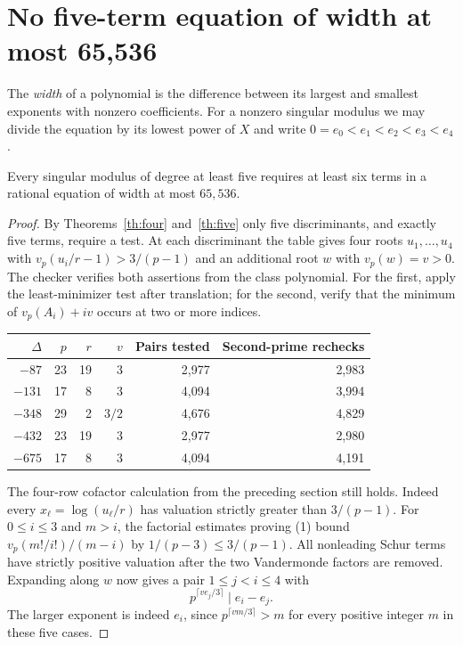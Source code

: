 \section{No five-term equation of width at most 65,536}
The \emph{width} of a polynomial is the difference between its largest and smallest exponents with nonzero coefficients. For a nonzero singular modulus we may divide the equation by its lowest power of $X$ and write $0=e_0<e_1<e_2<e_3<e_4$.

\begin{corollary}\label{cor:width}
Every singular modulus of degree at least five requires at least six terms in a rational equation of width at most $65{,}536$.
\end{corollary}
\begin{proof}
By Theorems~\ref{th:four} and~\ref{th:five} only five discriminants, and exactly five terms, require a test. At each discriminant the table gives four roots $u_1,\ldots,u_4$ with $v_p(u_i/r-1)>3/(p-1)$ and an additional root $w$ with $v_p(w)=v>0$. The checker verifies both assertions from the class polynomial. For the first, apply the least-minimizer test after translation; for the second, verify that the minimum of $v_p(A_i)+iv$ occurs at two or more indices.
\begin{center}\small
\begin{tabular}{@{}rrrrrr@{}}\toprule
$\Delta$ & $p$ & $r$ & $v$ & Pairs tested & Second-prime rechecks \\ \midrule
$-87$  & 23 & 19 & 3   & 2,977 & 2,983 \\
$-131$ & 17 &  8 & 3   & 4,094 & 3,994 \\
$-348$ & 29 &  2 & $3/2$ & 4,676 & 4,829 \\
$-432$ & 23 & 19 & 3   & 2,977 & 2,980 \\
$-675$ & 17 &  8 & 3   & 4,094 & 4,191 \\ \bottomrule
\end{tabular}
\end{center}
The four-row cofactor calculation from the preceding section still holds. Indeed every $x_\ell=\log(u_\ell/r)$ has valuation strictly greater than $3/(p-1)$. For $0\le i\le3$ and $m>i$, the factorial estimates proving (1) bound $v_p(m!/i!)/(m-i)$ by $1/(p-3)\le 3/(p-1)$. All nonleading Schur terms have strictly positive valuation after the two Vandermonde factors are removed. Expanding along $w$ now gives a pair $1\le j<i\le4$ with
\[
          p^{\lceil ve_j/3\rceil}\mid e_i-e_j .
\]
The larger exponent is indeed $e_i$, since $p^{\lceil v m/3\rceil}>m$ for every positive integer $m$ in these five cases.


\end{proof}

